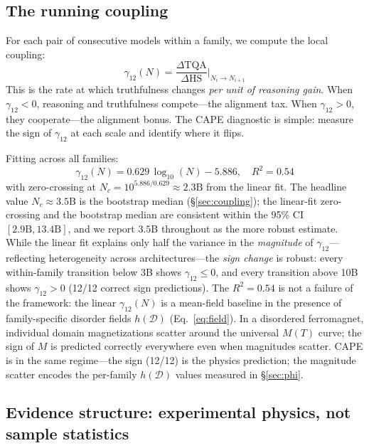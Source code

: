 \documentclass[11pt]{article}
\begin{document}
\subsection{The running coupling}

For each pair of consecutive models within a family, we compute the local coupling:
\begin{equation}
  \gamma_{12}(N) = \frac{\Delta\mathrm{TQA}}{\Delta\mathrm{HS}}
  \bigg|_{N_i \to N_{i+1}}
  \label{eq:coupling}
\end{equation}
This is the rate at which truthfulness changes \emph{per unit of reasoning gain}.
When $\gamma_{12} < 0$, reasoning and truthfulness compete---the alignment tax.
When $\gamma_{12} > 0$, they cooperate---the alignment bonus.
The CAPE diagnostic is simple: measure the sign of $\gamma_{12}$ at each scale
and identify where it flips.

Fitting across all families:
\begin{equation}
  \gamma_{12}(N) = 0.629\,\log_{10}(N) - 5.886,\quad R^2 = 0.54
  \label{eq:running}
\end{equation}
with zero-crossing at $N_c = 10^{5.886/0.629} \approx 2.3\text{B}$ from the linear fit.
The headline value $N_c \approx 3.5$B is the bootstrap median (\S\ref{sec:coupling}); the linear-fit zero-crossing and the bootstrap median are consistent within the 95\% CI $[2.9\text{B}, 13.4\text{B}]$, and we report $3.5$B throughout as the more robust estimate.
While the linear fit explains only half the variance in the \emph{magnitude}
of $\gamma_{12}$---reflecting heterogeneity across architectures---the \emph{sign change} is robust: every within-family transition
below 3B shows $\gamma_{12} \leq 0$, and every transition above 10B
shows $\gamma_{12} > 0$ (12/12 correct sign predictions).
The $R^2 = 0.54$ is not a failure of the framework: the linear $\gamma_{12}(N)$ is a mean-field baseline in the presence of family-specific disorder fields $h(\mathcal{D})$ (Eq.~\ref{eq:field}).
In a disordered ferromagnet, individual domain magnetizations scatter around the universal $M(T)$ curve; the sign of $M$ is predicted correctly everywhere even when magnitudes scatter.
CAPE is in the same regime---the sign (12/12) is the physics prediction; the magnitude scatter encodes the per-family $h(\mathcal{D})$ values measured in \S\ref{sec:phi}.


\subsection{Evidence structure: experimental physics, not sample statistics}
\end{document}
